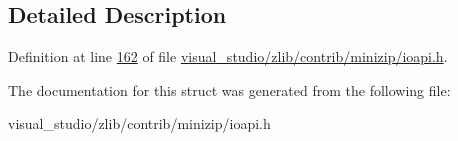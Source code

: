 \subsection{Detailed Description}


Definition at line \hyperlink{visual__studio_2zlib_2contrib_2minizip_2ioapi_8h_source_l00162}{162} of file \hyperlink{visual__studio_2zlib_2contrib_2minizip_2ioapi_8h_source}{visual\+\_\+studio/zlib/contrib/minizip/ioapi.\+h}.



The documentation for this struct was generated from the following file\+:\begin{DoxyCompactItemize}
\item 
visual\+\_\+studio/zlib/contrib/minizip/ioapi.\+h\end{DoxyCompactItemize}
